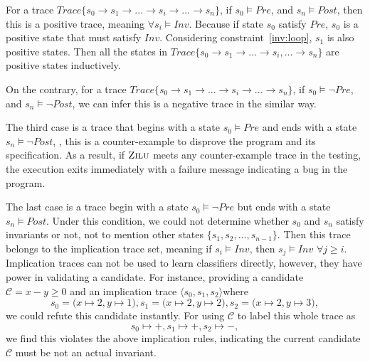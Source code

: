 For a trace $Trace\{s_0 \to s_1 \to ... \to s_i \to ... \to s_n\}$, 
if $s_0 \models Pre$, and $s_n \models Post$,
then this is a positive trace, meaning $\forall s_i \models Inv$.
Because if state $s_0$ satisfy $Pre$,
$s_0$ is a positive state that must satisfy $Inv$. %
Considering constraint~\ref{inv:loop}, $s_1$ is also positive states.
Then all the states in $Trace\{s_0 \to s_1 \to ...\to s_i, ... \to s_n\}$ are positive states inductively. 

On the contrary, for a trace $Trace\{s_0 \to s_1 \to ...\to s_i \to ... \to s_n\}$, 
if $s_0 \models \neg Pre$, and $s_n \models \neg Post$,
we can infer this is a negative trace in the similar way. 


The third case is a trace that begins with a state $s_0 \models Pre$ and ends with a state $s_n \models \neg Post$,
, this is a counter-example to disprove the program and its specification.
As a result, if $\textsc{Zilu}$ meets any counter-example trace in the testing, 
the execution exits immediately with a failure message indicating a bug in the program. 

The last case is a trace begin with a state $s_0 \models \neg Pre$ but ends with a state $s_n \models Post$.
Under this condition, we could not determine whether $s_0$ and $s_n$ satisfy invariants or not,
not to mention other states $\{s_1, s_2, ..., s_{n-1}\}$.
Then this trace belongs to the implication trace set, meaning if $s_i \models Inv$, then $s_j \models Inv$ $\forall j \ge i$.
Implication traces can not be used to learn classifiers directly, 
however, they have power in validating a candidate.
For instance, providing a candidate $\mathcal{C} = x - y \ge 0$ and an implication trace 
$\langle s_0, s_1, s_2\rangle$where 
$$s_0 = \big(x \mapsto 2, y \mapsto 1\big),  s_1 = \big(x \mapsto 2, y \mapsto 2\big),  s_2 = \big(x \mapsto 2, y \mapsto 3\big),$$
we could refute this candidate instantly.
For using $\mathcal{C}$ to label this whole trace as $$s_0 \mapsto +,  s_1 \mapsto +,  s_2 \mapsto -,$$ 
we find this violates the above implication rules,
indicating the current candidate $\mathcal{C}$ must be not an actual invariant.



